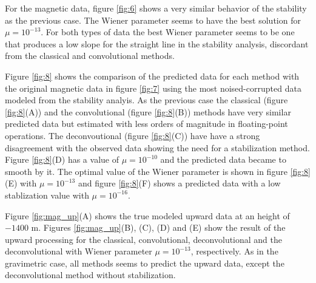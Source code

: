 For the magnetic data, figure \ref{fig:6} shows a very similar behavior of the stability as the previous case. The Wiener parameter seems to have the best solution for $\mu = 10^{-13}$. For both types of data the best Wiener parameter seems to be one that produces a low slope for the straight line in the stability analysis, discordant from the classical and convolutional methods. 

Figure \ref{fig:8} shows the comparison of the predicted data for each method with the original magnetic data in figure \ref{fig:7} using the most noised-corrupted data modeled from the stability analyis. As the previous case the classical (figure \ref{fig:8}(A)) and the convolutional (figure \ref{fig:8}(B)) methods have very similar predicted data but estimated with less orders of magnitude in floating-point operations. The deconvoutional (figure \ref{fig:8}(C)) have have a strong disagreement with the observed data showing the need for a stabilization method.
Figure \ref{fig:8}(D) has a value of $\mu = 10^{-10}$ and the predicted data became to smooth by it. The optimal value of the Wiener parameter is shown in figure \ref{fig:8}(E) with $\mu = 10^{-13}$ and figure \ref{fig:8}(F) shows a predicted data with a low stablization value with $\mu = 10^{-16}$.

Figure \ref{fig:mag_up}(A) shows the true modeled upward data at an height of $-1400$ m. Figures \ref{fig:mag_up}(B), (C), (D) and (E) show the result of the upward processing for the classical, convolutional, deconvolutional and the deconvolutional with Wiener parameter $\mu = 10^{-13}$, respectively. As in the gravimetric case, all methods seems to predict the upward data, except the deconvolutional method without stabilization.

%
%
%
%
